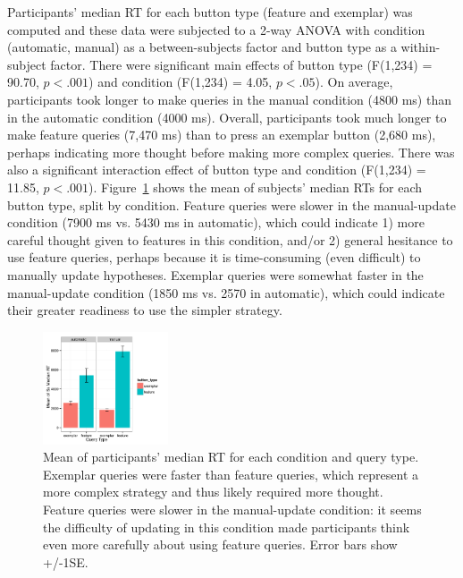 \documentclass[10pt,letterpaper]{article}
\begin{document}
Participants' median RT for each button type (feature and exemplar) was computed and these data were subjected to a 2-way ANOVA with condition (automatic, manual) as a 
between-subjects factor and button type as a within-subject factor. There
were significant main effects of button type (F(1,234) = 90.70, $p<.
001$) and condition (F(1,234) = 4.05, $p<.05$). On average, participants took longer to make queries in the manual condition (4800 ms) than in the automatic condition (4000 ms). Overall, participants took much longer to 
make feature queries (7,470 ms) than to press an exemplar button (2,680 ms), 
perhaps indicating more thought before making more complex queries. There was also a significant 
interaction effect of button type and condition (F(1,234) = 11.85, $p<.001$). Figure~\ref{fig:basic-rt} shows the mean of subjects' median RTs for each button type, split by condition. Feature queries were 
slower in the manual-update condition (7900 ms vs. 5430 ms in automatic), which could indicate 1) more careful thought given to features in this condition, and/or 2) general hesitance to use feature 
queries, perhaps because it is time-consuming (even difficult) to manually update 
hypotheses. Exemplar queries were somewhat faster in the manual-update condition (1850 ms vs. 2570 in automatic),
which could indicate their greater readiness to use the simpler strategy.

\begin{figure}[h]
  \centering
  \includegraphics[width=0.33\textwidth]{figures/RT_by_condition_query_type}
  \caption{Mean of participants' median RT for each condition and query type. 
Exemplar queries were faster than feature queries, which represent a more complex 
strategy and thus likely required more thought. Feature queries were slower in the 
manual-update condition: it seems the difficulty of updating in this condition made 
participants think even more carefully about using feature queries. Error bars show 
+/-1SE.}
  \label{fig:basic-rt}
\end{figure} 
\end{document}
